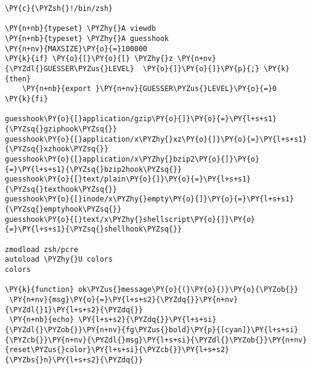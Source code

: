 \begin{Verbatim}[commandchars=\\\{\}]
\PY{c}{\PYZsh{}!/bin/zsh}

\PY{n+nb}{typeset} \PYZhy{}A viewdb
\PY{n+nb}{typeset} \PYZhy{}A guesshook
\PY{n+nv}{MAXSIZE}\PY{o}{=}100000
\PY{k}{if} \PY{o}{[}\PY{o}{[} \PYZhy{}z \PY{n+nv}{\PYZdl{}GUESSER\PYZus{}LEVEL}  \PY{o}{]}\PY{o}{]}\PY{p}{;} \PY{k}{then}
    \PY{n+nb}{export }\PY{n+nv}{GUESSER\PYZus{}LEVEL}\PY{o}{=}0
\PY{k}{fi}

guesshook\PY{o}{[}application/gzip\PY{o}{]}\PY{o}{=}\PY{l+s+s1}{\PYZsq{}gziphook\PYZsq{}}
guesshook\PY{o}{[}application/x\PYZhy{}xz\PY{o}{]}\PY{o}{=}\PY{l+s+s1}{\PYZsq{}xzhook\PYZsq{}}
guesshook\PY{o}{[}application/x\PYZhy{}bzip2\PY{o}{]}\PY{o}{=}\PY{l+s+s1}{\PYZsq{}bzip2hook\PYZsq{}}
guesshook\PY{o}{[}text/plain\PY{o}{]}\PY{o}{=}\PY{l+s+s1}{\PYZsq{}texthook\PYZsq{}}
guesshook\PY{o}{[}inode/x\PYZhy{}empty\PY{o}{]}\PY{o}{=}\PY{l+s+s1}{\PYZsq{}emptyhook\PYZsq{}}
guesshook\PY{o}{[}text/x\PYZhy{}shellscript\PY{o}{]}\PY{o}{=}\PY{l+s+s1}{\PYZsq{}shellhook\PYZsq{}}

zmodload zsh/pcre
autoload \PYZhy{}U colors
colors

\PY{k}{function} ok\PYZus{}message\PY{o}{(}\PY{o}{)}\PY{o}{\PYZob{}}
 \PY{n+nv}{msg}\PY{o}{=}\PY{l+s+s2}{\PYZdq{}}\PY{n+nv}{\PYZdl{}1}\PY{l+s+s2}{\PYZdq{}}
 \PY{n+nb}{echo} \PY{l+s+s2}{\PYZdq{}}\PY{l+s+si}{\PYZdl{}\PYZob{}}\PY{n+nv}{fg\PYZus{}bold}\PY{p}{[cyan]}\PY{l+s+si}{\PYZcb{}}\PY{n+nv}{\PYZdl{}msg}\PY{l+s+si}{\PYZdl{}\PYZob{}}\PY{n+nv}{reset\PYZus{}color}\PY{l+s+si}{\PYZcb{}}\PY{l+s+s2}{\PYZbs{}n}\PY{l+s+s2}{\PYZdq{}}


\end{Verbatim}
